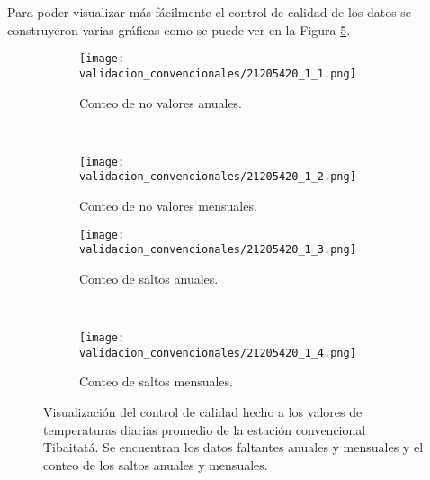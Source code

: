 Para poder visualizar más fácilmente el control de calidad de los datos se construyeron varias gráficas como se puede ver en la Figura \ref{gra:faltantes_saltos}.

\begin{figure}[H]
	\centering
	\begin{subfigure}[normla]{0.4\textwidth}
		\caption{Conteo de no valores anuales.}
	\texttt{[image: validacion\_convencionales/21205420\_1\_1.png]}

		\label{subfig:f1}
		\end{subfigure}
		~
    \begin{subfigure}[normla]{0.4\textwidth}
   		\caption{Conteo de no valores mensuales.}
	\texttt{[image: validacion\_convencionales/21205420\_1\_2.png]}
		\label{subfig:f2}
		\end{subfigure}
		
    \begin{subfigure}[normla]{0.4\textwidth}
		\caption{Conteo de saltos anuales.}
	\texttt{[image: validacion\_convencionales/21205420\_1\_3.png]}

		\label{subfig:f3}
		\end{subfigure}
		~
    \begin{subfigure}[normla]{0.4\textwidth}
		\caption{Conteo de saltos mensuales.}
	\texttt{[image: validacion\_convencionales/21205420\_1\_4.png]}

		\label{subfig:f4}
		\end{subfigure}

	
	\caption{Visualización del control de calidad hecho a los valores de temperaturas diarias promedio de la estación convencional Tibaitatá. Se encuentran los datos faltantes anuales y mensuales y el conteo de los saltos anuales y mensuales.}
	\label{gra:faltantes_saltos}	
\end{figure}

